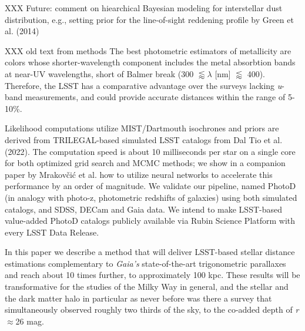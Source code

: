 




XXX Future: comment on hiearchical Bayesian modeling for interstellar dust distribution, e.g., setting prior for the line-of-sight
reddening profile by Green et al. (2014)



XXX  old text from methods 
The best photometric estimators of metallicity are colors whose shorter-wavelength component includes the metal absorbtion bands at near-UV wavelengths, short of Balmer break (300 $\lessapprox\lambda$ [nm] $\lessapprox$ 400). Therefore, the LSST has a comparative advantage over the surveys lacking \textit{u}-band measurements, and could provide accurate distances within the range of 5-10\%. 


Likelihood computations utilize MIST/Dartmouth isochrones
and priors are derived from TRILEGAL-based simulated LSST catalogs from Dal Tio et al. (2022). The computation speed is about 10 milliseconds per
star on a single core for both optimized grid search and MCMC methods; we show in a companion paper by Mrakov\v{c}i\'{c} et al. how to utilize neural
networks to accelerate this performance by an order of magnitude.  We validate our pipeline, named
PhotoD (in analogy with photo-z, photometric redshifts of galaxies) using both simulated catalogs, and SDSS, DECam and Gaia data. 
We intend to make LSST-based value-added PhotoD catalogs publicly
available via Rubin Science Platform with every LSST Data Release.


In this paper we describe a method that will deliver LSST-based stellar distance estimations complementary to \textit{Gaia's} state-of-the-art trigonometric parallaxes and reach about 10 times further, to approximately 100 kpc. These results will be transformative for the studies of the Milky Way in general, and the stellar and the dark matter halo in particular as never before was there a survey that simultaneously observed roughly two thirds of the sky, to the co-added depth of \textit{r}$\approx$26 mag. 


